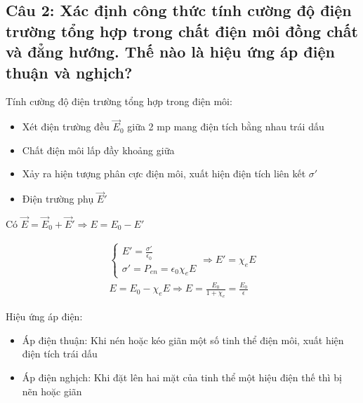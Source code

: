 \subsection[Câu 2]{Câu 2: Xác định công thức tính cường độ điện trường tổng hợp trong chất điện môi đồng chất và đẳng hướng. Thế nào là hiệu ứng áp điện thuận và nghịch?}

Tính cường độ điện trường tổng hợp trong điện môi:

\begin{itemize}
  \item Xét điện trường đều $\vec{E}_0$ giữa 2 mp mang điện tích bằng nhau trái dấu
  \item Chất điện môi lấp đầy khoảng giữa
  \item Xảy ra hiện tượng phân cực điện môi, xuất hiện điện tích liên kết $\sigma'$
  \item Điện trường phụ $\vec{E}'$
\end{itemize}

Có $\vec{E} = \vec{E}_0 + \vec{E}' \Rightarrow E = E_0 - E'$

\begin{gather*}
  \begin{cases}
    E' = \frac{\sigma'}{\epsilon_0}\\
    \sigma' = P_{en} = \epsilon_0 \chi_e E
  \end{cases}
  \Rightarrow E' = \chi_e E \\
  E = E_0 - \chi_e E \Rightarrow E = \frac{E_0}{1+\chi_e} = \frac{E_0}{\epsilon}
\end{gather*}

Hiệu ứng áp điện:

\begin{itemize}
  \item Áp điện thuận: Khi nén hoặc kéo giãn một số tinh thể điện môi, xuất hiện điện tích trái dấu
  \item Áp điện nghịch: Khi đặt lên hai mặt của tinh thể một hiệu điện thế thì bị nẽn hoặc giãn
\end{itemize}